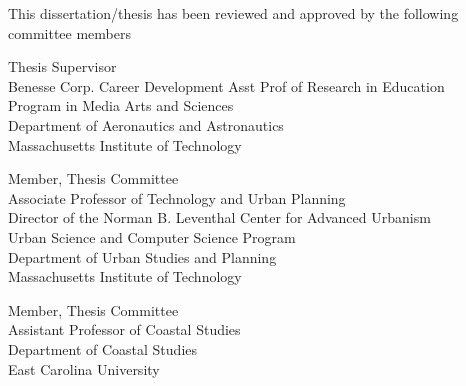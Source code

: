 %
%
%

\begin{titlepage}

\makesigtitle

\begin{large}
This dissertation/thesis has been reviewed and approved by the following committee members


\signature{Professor Danielle Wood}{Thesis Supervisor \\
   Benesse Corp. Career Development Asst Prof of Research in Education \\
   Program in Media Arts and Sciences \\
   Department of Aeronautics and Astronautics \\ 
   Massachusetts Institute of Technology}

\signature{Professor Sarah Williams}{Member, Thesis Committee \\
	Associate Professor of Technology and Urban Planning \\  
	Director of the Norman B. Leventhal Center for Advanced Urbanism \\
	Urban Science and Computer Science Program \\ 
	Department of Urban Studies and Planning \\
	Massachusetts Institute of Technology}

\signature{Professor David Lagomasino}{Member, Thesis Committee \\
   Assistant Professor of Coastal Studies \\ 
   Department of Coastal Studies \\
   East Carolina University}
   
\end{large}
\end{titlepage}

